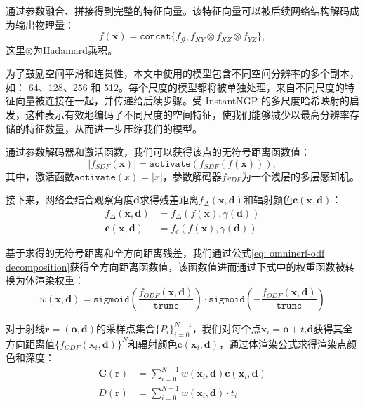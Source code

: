 通过参数融合、拼接得到完整的特征向量。该特征向量可以被后续网络结构解码成为输出物理量：
\begin{equation}
    f(\mathbf{x}) = \mathtt{concat}\{f_{\mathcal{G}}, f_{XY}\otimes f_{XZ} \otimes f_{YZ}\},
\end{equation}
这里$\otimes$为Hadamard乘积\cite{fridovich-keil_k-planes_2023}。

为了鼓励空间平滑和连贯性，本文中使用的模型包含不同空间分辨率的多个副本，如： 64、128、256 和 512。每个尺度的模型都将被单独处理，来自不同尺度的特征向量被连接在一起，并传递给后续步骤。受 InstantNGP \cite{muller_instant_2022} 的多尺度哈希映射的启发，这种表示有效地编码了不同尺度的空间特征，使我们能够减少以最高分辨率存储的特征数量，从而进一步压缩我们的模型。

通过参数解码器和激活函数，我们可以获得该点的无符号距离函数值：
\begin{equation}
    |f_{SDF}(\mathbf{x})| = \mathtt{activate}(f_{SDF}(f(\mathbf{x}))),
\end{equation}
其中，激活函数$\mathtt{activate}(x)=|x|$，参数解码器$f_{SDF}$为一个浅层的多层感知机。

接下来，网络会结合观察角度$\mathbf{d}$求得残差距离$f_\Delta(\mathbf{x}, \mathbf{d})$和辐射颜色$\mathbf{c}(\mathbf{x},\mathbf{d})$：
\begin{align}
    f_\Delta(\mathbf{x}, \mathbf{d})&=f_\Delta(f(\mathbf{x}), \gamma(\mathbf{d}))\\
    \mathbf{c}(\mathbf{x},\mathbf{d}) &=f_c(f(\mathbf{x}), \gamma(\mathbf{d}))
\end{align}

基于求得的无符号距离和全方向距离残差，我们通过公式\ref{eq: omninerf-odf decomposition}获得全方向距离函数值，该函数值进而通过下式中的权重函数被转换为体渲染权重：
\begin{equation}
    w(\mathbf{x},\mathbf{d}) = \mathtt{sigmoid}\left(\frac{f_{ODF}(\mathbf{x},\mathbf{d})}{\mathtt{trunc}}\right)\cdot\mathtt{sigmoid}\left(-\frac{f_{ODF}(\mathbf{x},\mathbf{d})}{\mathtt{trunc}}\right)
\end{equation}

对于射线$\mathbf{r} = (\mathbf{o},\mathbf{d})$的采样点集合$\{P_i\}_{i=0}^{N-1}$，我们对每个点$\mathbf{x}_i=\mathbf{o}+t_i\mathbf{d}$获得其全方向距离值$\{f_{ODF}(\mathbf{x}_i,\mathbf{d})\}^N$和辐射颜色$\mathbf{c}(\mathbf{x}_i,\mathbf{d})$，通过体渲染公式求得渲染点颜色和深度：
\begin{align}
    \mathbf{C}(\mathbf{r}) &= \sum_{i=0}^{N-1}w(\mathbf{x}_i,\mathbf{d})\mathbf{c}(\mathbf{x}_i,\mathbf{d})\\
    D(\mathbf{r}) &= \sum_{i=0}^{N-1}w(\mathbf{x}_i,\mathbf{d})\cdot t_i
\end{align}


